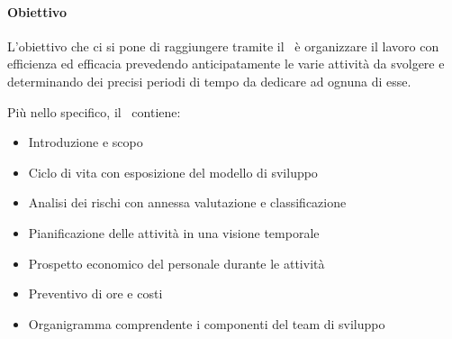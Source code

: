 			\paragraph{Obiettivo}
			L'obiettivo che ci si pone di raggiungere tramite il \PdP\ è organizzare il lavoro con efficienza ed efficacia prevedendo anticipatamente le varie attività da svolgere e determinando dei precisi periodi di tempo da dedicare ad ognuna di esse. \par
			Più nello specifico, il \PdPv\ contiene:
			\begin{itemize}
				\item Introduzione e scopo
				\item Ciclo di vita con esposizione del modello di sviluppo
				\item Analisi dei rischi con annessa valutazione e classificazione
				\item Pianificazione delle attività in una visione temporale
				\item Prospetto economico del personale durante le attività
				\item Preventivo di ore e costi
				\item Organigramma comprendente i componenti del team di sviluppo
			\end{itemize}

